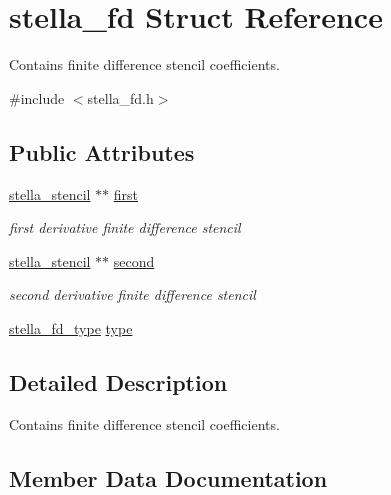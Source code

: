 \hypertarget{structstella__fd}{}\section{stella\+\_\+fd Struct Reference}
\label{structstella__fd}


Contains finite difference stencil coefficients.  




{\ttfamily \#include $<$stella\+\_\+fd.\+h$>$}

\subsection*{Public Attributes}
\begin{DoxyCompactItemize}
\item 
\mbox{\hyperlink{structstella__stencil}{stella\+\_\+stencil}} $\ast$$\ast$ \mbox{\hyperlink{structstella__fd_aa59671954e61ca257a3752244deb9af7}{first}}
\begin{DoxyCompactList}\small\item\em first derivative finite difference stencil \end{DoxyCompactList}\item 
\mbox{\hyperlink{structstella__stencil}{stella\+\_\+stencil}} $\ast$$\ast$ \mbox{\hyperlink{structstella__fd_a8ee0850edffa0b584f7fec78e07f905c}{second}}
\begin{DoxyCompactList}\small\item\em second derivative finite difference stencil \end{DoxyCompactList}\item 
\mbox{\hyperlink{stella__fd_8h_adcce97872fa6093ccd0f766114685feb}{stella\+\_\+fd\+\_\+type}} \mbox{\hyperlink{structstella__fd_aed24907996901e2ea3c6cfd10d9d6bd1}{type}}
\end{DoxyCompactItemize}


\subsection{Detailed Description}
Contains finite difference stencil coefficients. 

\subsection{Member Data Documentation}
\mbox{\label{structstella__fd_aa59671954e61ca257a3752244deb9af7}} 
